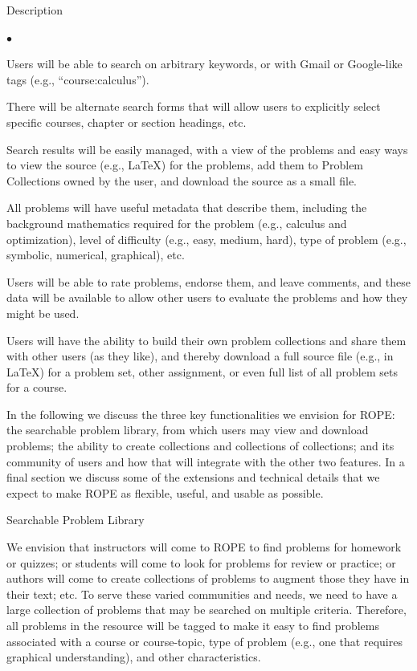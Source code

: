 \documentclass[11pt]{article}
\begin{document}
\begin{section}{Description}
\begin{list}{$\bullet$}{\setlength{\parsep}{0pt}\setlength{\itemsep}{0pt}}
  \item
    Users will be able to search on arbitrary keywords, or with Gmail or
    Google-like tags (e.g., ``course:calculus'').
  \item
    There will be alternate search forms that will allow users to
    explicitly select specific courses, chapter or section headings, etc.
  \item
    Search results will be easily managed, with a view of the problems and
    easy ways to view the source (e.g., \LaTeX) for the problems, add them
    to Problem Collections owned by the user, and download the
    source as a small file.
  \item
    All problems will have useful metadata that describe them, including
    the background mathematics required for the problem (e.g., calculus
    and optimization), level of difficulty (e.g., easy, medium, hard),
    type of problem (e.g., symbolic, numerical, graphical), etc.
  \item
    Users will be able to rate problems, endorse them, and leave comments,
    and these data will be available to allow other users to evaluate the
    problems and how they might be used.
  \item
    Users will have the ability to build their own problem collections and
    share them with other users (as they like), and thereby download a
    full source file (e.g., in \LaTeX) for a problem set, other
    assignment, or even full list of all problem sets for a course.
\end{list}

In the following we discuss the three key functionalities we envision for
ROPE: the searchable problem library, from which users may view and
download problems; the ability to create collections and 
collections of collections; and its community of users and how that will
integrate with the other two features.  In a final section we discuss some
of the extensions and technical details that we expect to make ROPE as
flexible, useful, and usable as possible.

\begin{subsection}{Searchable Problem Library}

We envision that instructors will come to ROPE to find problems for
homework or quizzes; or students will come to look for problems for review
or practice; or authors will come to create collections of problems to
augment those they have in their text; etc.  To serve these varied
communities and needs, we need to have a large collection of problems that
may be searched on multiple criteria.  Therefore, all problems in the
resource will be tagged to make it easy to find problems associated with a
course or course-topic, type of problem (e.g., one that requires graphical
understanding), and other characteristics.


\end{subsection}
\end{section}
\end{document}
